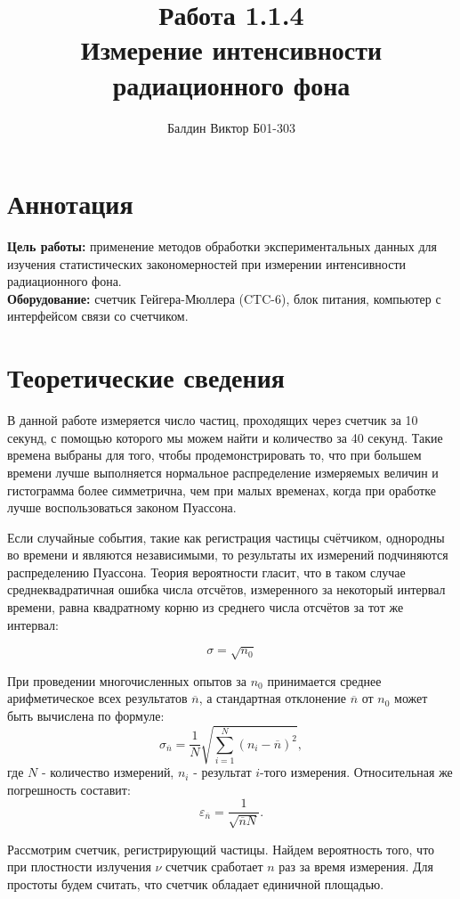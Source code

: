 \documentclass[a4paper, 12pt]{article}
\author{Балдин Виктор Б01-303}
\title{Работа 1.1.4 \\ Измерение интенсивности радиационного фона}
\begin{document}
	\maketitle
	\section{Аннотация}
	\textbf{Цель работы:} применение методов обработки экспериментальных данных
	для изучения статистических закономерностей
	при измерении интенсивности радиационного фона.
	\bigskip\\
	\textbf{Оборудование:} счетчик Гейгера-Мюллера (CTC-6), блок питания, компьютер
	с интерфейсом связи со счетчиком.

	\section{Теоретические сведения}
	В данной работе измеряется число частиц, проходящих через счетчик за 10 секунд, с помощью которого мы можем найти и количество за 40 секунд. Такие времена выбраны для того, чтобы продемонстрировать то, что при большем времени лучше выполняется нормальное распределение измеряемых величин и гистограмма более симметрична, чем при малых временах, когда при оработке лучше воспользоваться законом Пуассона.

	Если случайные события, такие как регистрация частицы счётчиком, однородны во времени и являются независимыми, то результаты их измерений подчиняются распределению Пуассона. Теория вероятности гласит, что в таком случае среднеквадратичная ошибка числа отсчётов, измеренного за некоторый интервал времени, равна квадратному корню из среднего числа отсчётов за тот же интервал:

	\begin{equation}
		\sigma = \sqrt{n_0}
	\end{equation}


	При проведении многочисленных опытов за $n_0$ принимается среднее арифметическое всех результатов
	$\overline n$, а стандартная отклонение $\overline n$ от $n_0$ может быть
	вычислена по формуле:
	\[ \sigma_{\overline n} = \frac{1}{N} \sqrt{\sum_{i=1}^N(n_i - \overline n)^2}, \] где $N$ - количество измерений, $n_i$ - результат $i$-того измерения. Относительная же погрешность составит: \[ \varepsilon_{\overline n} = \frac{1}{\sqrt{\overline n N}}. \]

	Рассмотрим счетчик, регистрирующий частицы. Найдем вероятность того,
	что при плостности излучения $\nu$ счетчик сработает $n$
	раз за время измерения. Для простоты будем считать, что
	счетчик обладает единичной площадью.
\end{document}
